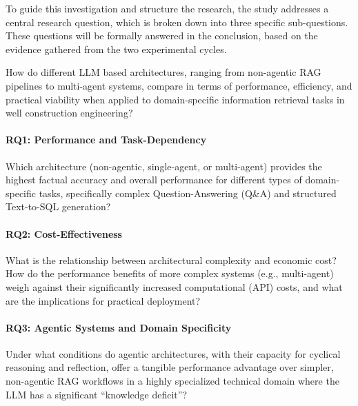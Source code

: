     To guide this investigation and structure the research, the study addresses a central research question, which is broken down into three specific sub-questions. These questions will be formally answered in the conclusion, based on the evidence gathered from the two experimental cycles.

    \vspace{\baselineskip}
    \begin{tcolorbox}[colback=gray!10, colframe=gray!40, title=\textbf{Main Research Question}]
    How do different LLM based architectures, ranging from non-agentic RAG pipelines to multi-agent systems, compare in terms of performance, efficiency, and practical viability when applied to domain-specific information retrieval tasks in well construction engineering?
    \end{tcolorbox}
    \vspace{\baselineskip}

    \paragraph{RQ1: Performance and Task-Dependency} Which architecture (non-agentic, single-agent, or multi-agent) provides the highest factual accuracy and overall performance for different types of domain-specific tasks, specifically complex Question-Answering (Q\&A) and structured Text-to-SQL generation?

    \paragraph{RQ2: Cost-Effectiveness} What is the relationship between architectural complexity and economic cost? How do the performance benefits of more complex systems (e.g., multi-agent) weigh against their significantly increased computational (API) costs, and what are the implications for practical deployment?

    \paragraph{RQ3: Agentic Systems and Domain Specificity} Under what conditions do agentic architectures, with their capacity for cyclical reasoning and reflection, offer a tangible performance advantage over simpler, non-agentic RAG workflows in a highly specialized technical domain where the LLM has a significant ``knowledge deficit''?

    \vspace{\baselineskip}

